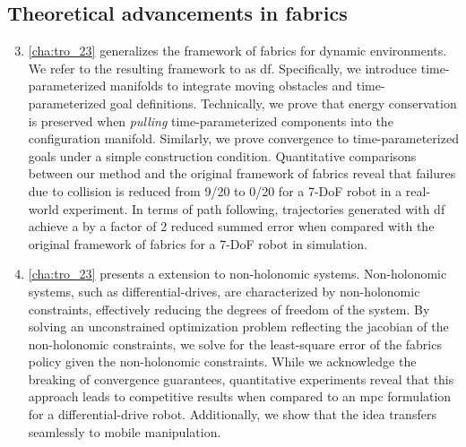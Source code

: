 \subsection{Theoretical advancements in \ac{fabrics}}
\begin{enumerate}
    \setcounter{enumi}{2}
    \item \cref{cha:tro_23} generalizes the framework of \ac{fabrics}
      for dynamic environments. We refer to the resulting
      framework to as \ac{df}. Specifically, we introduce
      time-parameterized manifolds to integrate moving
      obstacles and time-parameterized goal definitions.
      Technically,
      we prove that energy conservation is preserved when
      \textit{pulling} time-parameterized components into
      the configuration manifold. 
      Similarly, we prove convergence to
      time-parameterized goals under a simple construction
      condition. Quantitative comparisons between our method
      and the original framework of \ac{fabrics} reveal
      that failures due to collision is reduced from 9/20
      to 0/20 for a 7-DoF robot in a real-world experiment.
      In terms of path following, trajectories generated
      with \ac{df} achieve a by a factor of 2 reduced summed error 
      when compared with the original framework of
      \ac{fabrics} for a 7-DoF robot in simulation.
    \item \cref{cha:tro_23} presents a extension to
      non-holonomic systems. Non-holonomic systems, such as
      differential-drives, are characterized by
      non-holonomic constraints, effectively reducing the
      degrees of freedom of the system. By solving an
      unconstrained optimization problem reflecting the
      jacobian of the non-holonomic constraints, we solve
      for the least-square error of the \ac{fabrics} policy
      given the non-holonomic constraints. While we
      acknowledge the breaking of convergence guarantees,
      quantitative experiments reveal that this approach leads to
      competitive results when compared to an \ac{mpc}
      formulation for a differential-drive robot.
      Additionally, we show that the idea transfers seamlessly
      to mobile manipulation.
\end{enumerate}

